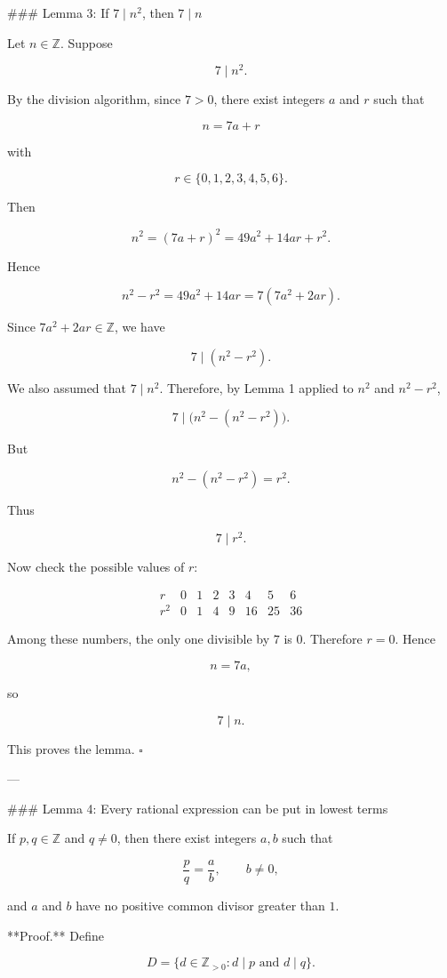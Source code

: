 ### Lemma 3: If \(7\mid n^2\), then \(7\mid n\)

Let \(n\in\mathbb Z\). Suppose

\[
7\mid n^2.
\]

By the division algorithm, since \(7>0\), there exist integers \(a\) and \(r\) such that

\[
n=7a+r
\]

with

\[
r\in\{0,1,2,3,4,5,6\}.
\]

Then

\[
n^2=(7a+r)^2=49a^2+14ar+r^2.
\]

Hence

\[
n^2-r^2=49a^2+14ar=7(7a^2+2ar).
\]

Since \(7a^2+2ar\in\mathbb Z\), we have

\[
7\mid (n^2-r^2).
\]

We also assumed that \(7\mid n^2\). Therefore, by Lemma 1 applied to \(n^2\) and \(n^2-r^2\),

\[
7\mid \bigl(n^2-(n^2-r^2)\bigr).
\]

But

\[
n^2-(n^2-r^2)=r^2.
\]

Thus

\[
7\mid r^2.
\]

Now check the possible values of \(r\):

\[
\begin{array}{c|ccccccc}
r & 0 & 1 & 2 & 3 & 4 & 5 & 6 \\
\hline
r^2 & 0 & 1 & 4 & 9 & 16 & 25 & 36
\end{array}
\]

Among these numbers, the only one divisible by \(7\) is \(0\). Therefore \(r=0\). Hence

\[
n=7a,
\]

so

\[
7\mid n.
\]

This proves the lemma. \(\square\)

---

### Lemma 4: Every rational expression can be put in lowest terms

If \(p,q\in\mathbb Z\) and \(q\neq 0\), then there exist integers \(a,b\) such that

\[
\frac{p}{q}=\frac{a}{b}, \qquad b\neq 0,
\]

and \(a\) and \(b\) have no positive common divisor greater than \(1\).

**Proof.** Define

\[
D=\{d\in\mathbb Z_{>0}: d\mid p \text{ and } d\mid q\}.
\]

